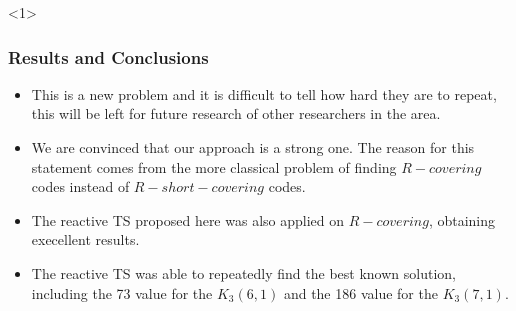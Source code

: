 \documentclass{beamer}
\begin{document}
\begin{frame}<1>
  \frametitle{Results and Conclusions}

{ 
	\footnotesize
  \begin{itemize}
  	\item This is a new problem and it is difficult to tell how hard they are to repeat, this will be left for future research of other researchers in the area.
  	
  	\item We are convinced that our approach is a strong one. The reason for this statement comes from the more classical problem of finding $R-covering$ codes instead of $R-short-covering$ codes.
  	
  	\item The reactive TS proposed here was also applied on $R-covering$, obtaining execellent results.
  	
  	\item The reactive TS was able to repeatedly find the best known solution, including the 73 value for the $K_{3}(6,1)$ and the 186 value for the $K_{3}(7,1)$.
  
  \end{itemize}

}
\end{frame}
\end{document}
